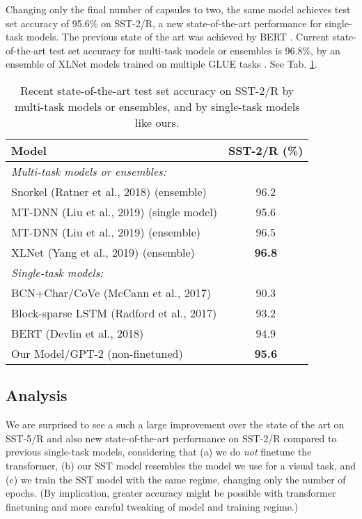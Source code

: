 \documentclass[11pt,a4paper]{article}
\begin{document}
Changing only the final number of capsules to two, the same model achieves test set accuracy of 95.6\% on SST-2/R, a new state-of-the-art performance for single-task models. The previous state of the art was achieved by BERT \cite{DBLP:journals/corr/abs-1810-04805}. Current state-of-the-art test set accuracy for multi-task models or ensembles is 96.8\%, by an ensemble of XLNet models trained on multiple GLUE tasks \cite{DBLP:journals/corr/abs-1906-08237}. See Tab. \ref{tab:SST2R}.

\begin{table}[h]
	\small
	\begin{center}
		\begin{tabular}{@{}lc@{}}
			\toprule
			\bf Model & \bf SST-2/R (\%) \\
			\midrule
			\em Multi-task models or ensembles: &  \\
			Snorkel (Ratner et al., 2018) (ensemble) & 96.2 \\
			MT-DNN (Liu et al., 2019) (single model) & 95.6 \\
			MT-DNN (Liu et al., 2019) (ensemble) & 96.5 \\
			XLNet (Yang et al., 2019) (ensemble) & \bf 96.8 \\
			\midrule
			\em Single-task models: & \\
			BCN+Char/{\scriptsize CoVe} (McCann et al., 2017) & 90.3 \\		
			Block-sparse LSTM (Radford et al., 2017) & 93.2 \\
			BERT (Devlin et al., 2018) & 94.9 \\
			Our Model/{\scriptsize GPT-2 (non-finetuned)} & \bf 95.6 \\
			\bottomrule
		\end{tabular}
	\end{center}
	\caption{\label{tab:SST2R}Recent state-of-the-art test set accuracy on SST-2/R by multi-task models or ensembles, and by single-task models like ours.}
\end{table}

\subsection{Analysis}

We are surprised to see a such a large improvement over the state of the art on SST-5/R and also new state-of-the-art performance on SST-2/R compared to previous single-task models, considering that (a) we do {\em not} finetune the transformer, (b) our SST model resembles the model we use for a visual task, and (c) we train the SST model with the same regime, changing only the number of epochs. (By implication, greater accuracy might be possible with transformer finetuning and more careful tweaking of model and training regime.)
\end{document}
